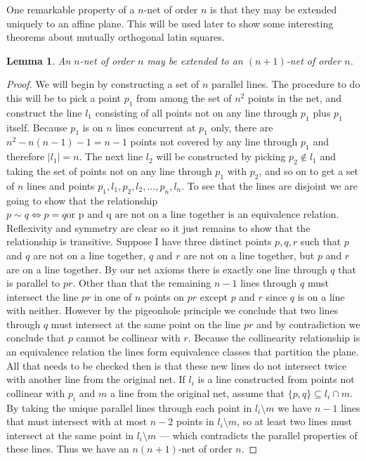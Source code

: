 \documentclass{article}
\newtheorem{lemma}{Lemma}
\begin{document}
One remarkable property of a \(n\)-net of order \(n\) is that they may be extended uniquely to an affine plane. This will be used later to show some interesting theorems about mutually orthogonal latin squares.

\begin{lemma}\label{lemma:net-extension}
An \(n\)-net of order \(n\) may be extended to an \((n + 1)\)-net of order \(n\).
\end{lemma}

\begin{proof}
  We will begin by constructing a set of \(n\) parallel lines. The procedure to do this will be to pick a point \(p_{1}\) from among the set of \(n^{2}\) points in the net, and construct the line \(l_{1}\) consisting of all points not on any line through \(p_{1}\) plus \(p_{1}\) itself. Because \(p_{1}\) is on \(n\) lines concurrent at \(p_{1}\) only, there are \(n^{2} - n(n - 1) - 1 = n - 1\) points not covered by any line through \(p_{1}\) and therefore \(|l_{1}| = n\). The next line \(l_{2}\) will be constructed by picking \(p_{2} \notin l_{1}\) and taking the set of points not on any line through \(p_{1}\) with \(p_{2}\), and so on to get a set of \(n\) lines and points \(p_{1}, l_{1}, p_{2}, l_{2}, \ldots, p_{n}, l_{n}\). To see that the lines are disjoint we are going to show that the relationship \(p \sim q \iff p = q \text{or p and q are not on a line together}\) is an equivalence relation. Reflexivity and symmetry are clear so it just remains to show that the relationship is transitive. Suppose I have three distinct points \(p, q, r\) such that \(p\) and \(q\) are not on a line together, \(q\) and \(r\) are not on a line together, but \(p\) and \(r\) are on a line together.
  By our net axioms there is exactly one line through \(q\) that is parallel to \(pr\). Other than that the remaining \(n - 1\) lines through \(q\) must intersect the line \(pr\) in one of \(n\) points on \(pr\) except \(p\) and \(r\) since \(q\) is on a line with neither. However by the pigeonhole principle we conclude that two lines through \(q\) must intersect at the same point on the line \(pr\) and by contradiction we conclude that \(p\) cannot be collinear with \(r\). Because the collinearity relationship is an equivalence relation the lines form equivalence classes that partition the plane. All that needs to be checked then is that these new lines do not intersect twice with another line from the original net. If \(l_{i}\) is a line constructed from points not collinear with \(p_{i}\) and \(m\) a line from the original net, assume that \(\{p, q\} \subseteq l_{i} \cap m\). By taking the unique parallel lines through each point in \(l_{i} \setminus m\) we have \(n - 1\) lines that must intersect with at most \(n - 2\) points in \(l_{i} \setminus m\), so at least two lines must intersect at the same point in \(l_{i} \setminus m\) --- which contradicts the parallel properties of these lines. Thus we have an \(n(n + 1)\)-net of order \(n\).
\end{proof}
\end{document}
